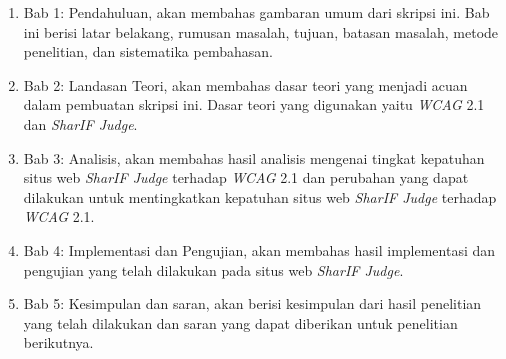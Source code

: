 \begin{enumerate}
	\item Bab 1: Pendahuluan, akan membahas gambaran umum dari skripsi ini. Bab ini berisi latar
	belakang, rumusan masalah, tujuan, batasan masalah, metode penelitian, dan sistematika
	pembahasan.
	\item Bab 2: Landasan Teori, akan membahas dasar teori yang menjadi acuan dalam pembuatan
	skripsi ini. Dasar teori yang digunakan yaitu \textit{WCAG} 2.1 dan \textit{SharIF Judge}.
	\item Bab 3: Analisis, akan membahas hasil analisis mengenai tingkat kepatuhan situs web \textit{SharIF Judge} terhadap \textit{WCAG} 2.1 dan perubahan yang dapat dilakukan untuk mentingkatkan kepatuhan situs web \textit{SharIF Judge} terhadap \textit{WCAG} 2.1.
	\item Bab 4: Implementasi dan Pengujian, akan membahas hasil implementasi dan pengujian yang
	telah dilakukan pada situs web \textit{SharIF Judge}.
	\item Bab 5: Kesimpulan dan saran, akan berisi kesimpulan dari hasil penelitian yang telah dilakukan dan saran yang dapat diberikan untuk penelitian berikutnya.
\end{enumerate}